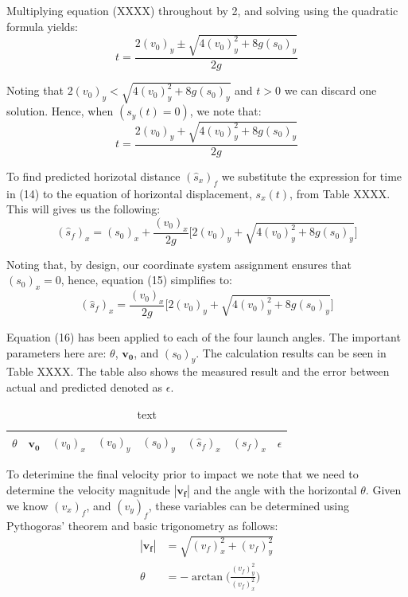 \documentclass[a4paper]{article}
\begin{document}
Multiplying equation (XXXX) throughout by 2, and solving using the quadratic formula yields:
\begin{equation}
t = \frac{2(v_0)_y \pm \sqrt{4(v_0)_y^2 + 8g(s_0)_y}}{2g}
\end{equation} 

Noting that $2(v_0)_y < \sqrt{4(v_0)_y^2 + 8g(s_0)_y}$ and $t>0$ we can discard one solution. Hence, when $(s_y(t) = 0)$, we note that:
\begin{equation}
t = \frac{2(v_0)_y + \sqrt{4(v_0)_y^2 + 8g(s_0)_y}}{2g}
\end{equation}

To find predicted horizotal distance ${(\hat{s}_x)_f}$ we substitute the expression for time in (14) to the equation of horizontal displacement, $s_x(t)$, from Table XXXX. This will gives us the following:
\begin{equation}
(\hat{s}_f)_x = (s_0)_x + \frac{(v_0)_x}{2g} \bigg[2(v_0)_y + \sqrt{4(v_0)_y^2 + 8g(s_0)_y}\bigg]
\end{equation}

Noting that, by design, our coordinate system assignment ensures that $(s_0)_x = 0$, hence, equation (15) simplifies to:
\begin{equation}
(\hat{s}_f)_x = \frac{(v_0)_x}{2g} \bigg[2(v_0)_y + \sqrt{4(v_0)_y^2 + 8g(s_0)_y}\bigg]
\end{equation}

Equation (16) has been applied to each of the four launch angles. The important parameters here are: $\theta$, $\boldsymbol{v_0}$, and $(s_0)_y$. The calculation results can be seen in Table XXXX. The table also shows the measured result and the error between actual and predicted denoted as $\epsilon$.
\begin{table}[h]
	\centering
	\caption{text}
	\begin{tabular}{rrrrrrrr}
		\toprule
		$\theta$ & $\boldsymbol{v_0}$ & $(v_0)_x$ & $(v_0)_y$ & $(s_0)_y$ & $(\hat{s}_f)_x$ & $(s_f)_x$ & $\epsilon$\\
		\midrule
		\bottomrule
	\end{tabular}
\end{table}

To deterimine the final velocity prior to impact we note that we need to determine the velocity magnitude $|\boldsymbol{v_f}|$ and the angle with the horizontal $\theta$. Given we know $(v_x)_f$, and $(v_y)_f$, these variables can be determined using Pythogoras' theorem and basic trigonometry as follows:
\begin{align}
|\boldsymbol{v_f}| &= \sqrt{(v_f)_x^2 + (v_f)_y^2}\\
\theta &= -\arctan\bigg(\frac{(v_f)_y^2}{(v_f)_x^2}\bigg)
\end{align} 
\end{document}
